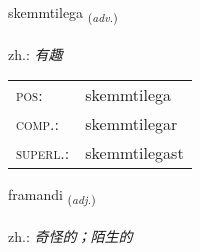 \documentclass[frontgrid, backgrid]{flacards}\usepackage[]{graphicx}\usepackage[]{xcolor}
\begin{document}
\renewcommand{\flhead}{\vskip5pt \fboxsep=0pt {\small\bfseries\footnotesize Atviksorð | 副词}}
\renewcommand{\fcfoot}{\vskip5pt \fboxsep=0pt \hspace{2pt}{\small\bfseries\footnotesize 3K}}

\renewcommand{\blhead}{\vskip5pt {\small\bfseries\footnotesize Atviksorð | 副词 }}
\renewcommand{\bcfoot}{\vskip5pt \hspace{2pt}{\small\bfseries\footnotesize 3K}}


{skemmtilega \small{\textsubscript{(\textit{adv.})}} \\[1ex] %
\textphonetic{[scɛmtɪlɛɣa]} \\
zh.: \emph{有趣} \\  [2ex]
\renewcommand*{\arraystretch}{0.8}
\begin{tabular}{ll}
\textsc{pos}: & skemmtilega \\ 
\textsc{comp.}: & skemmtilegar \\ 
\textsc{superl.}: & skemmtilegast \\
\end{tabular}
}

\renewcommand{\flhead}{\vskip5pt \fboxsep=0pt {\small\bfseries\footnotesize Lýsingarorð | 形容词}}
\renewcommand{\fcfoot}{\vskip5pt \fboxsep=0pt \hspace{2pt}{\small\bfseries\footnotesize 3K}}

\renewcommand{\blhead}{\vskip5pt {\small\bfseries\footnotesize Lýsingarorð | 形容词 }}
\renewcommand{\bcfoot}{\vskip5pt \hspace{2pt}{\small\bfseries\footnotesize 3K}}


{framandi \small{\textsubscript{(\textit{adj.})}} \\[1ex] %
\textphonetic{[fraːmantɪ]} \\
zh.: \emph{奇怪的；陌生的} \\  [2ex]
\renewcommand*{\arraystretch}{0.8}
}
\end{document}
